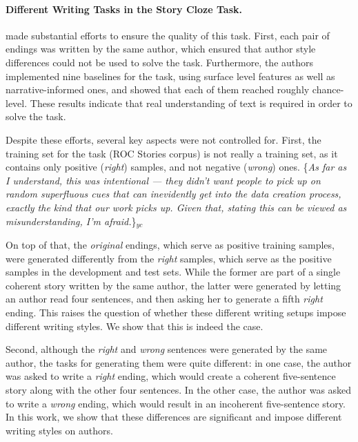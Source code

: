 \documentclass[11pt,a4paper]{article}
\newcommand{\yc}[1]{{\color{bblue}\{\textit{#1}\}$_{yc}$}}
\begin{document}
\paragraph{Different Writing Tasks in the Story Cloze Task.}
\citet{Mostafazadeh:2016} made substantial efforts to ensure the quality of this task. 
First, each pair of endings was written by the same author, which ensured that author style differences could not be used to solve the task. 
Furthermore, the authors implemented nine baselines for the task, using surface level features as well as narrative-informed ones, and showed that each of them reached roughly chance-level.
These results indicate that real understanding of text is required in order to solve the task.

Despite these efforts, several key aspects were not controlled for. 
First, the training set for the task (ROC Stories corpus) is not really a training set, as it contains only positive ({\it right}) samples, and not negative ({\it wrong}) ones. 
\yc{As far as I understand, this was intentional --- they didn't want people to pick up on random superfluous cues that can inevidently get into the data creation process, exactly the kind that our work picks up. Given that, stating this can be viewed as misunderstanding, I'm afraid.}

On top of that, the {\it original} endings, which serve as positive training samples, were generated differently from the {\it right} samples, which serve as the positive samples in the development and test sets. 
While the former are part of a single coherent story written by the same author, the latter were generated by letting an author read four sentences, 
and then asking her to generate a fifth {\it right} ending. 
This raises the question of whether these different writing setups impose different writing styles. 
We show that this is indeed the case. 

Second, although the {\it right} and {\it wrong} sentences were generated by the same author, 
the tasks for generating them were quite different: in one case, the author was asked to write a {\it right} ending, which would create a coherent five-sentence story along with the other four sentences. In the other case, the author was asked to write a {\it wrong} ending, which would result in an incoherent five-sentence story. 
In this work, we show that these differences are significant and impose different writing styles on authors.
\end{document}
